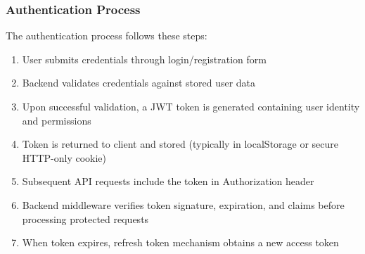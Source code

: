 \documentclass[12pt,a4paper]{article}
\begin{document}
\subsubsection{Authentication Process}
The authentication process follows these steps:

\begin{enumerate}
    \item User submits credentials through login/registration form
    \item Backend validates credentials against stored user data
    \item Upon successful validation, a JWT token is generated containing user identity and permissions
    \item Token is returned to client and stored (typically in localStorage or secure HTTP-only cookie)
    \item Subsequent API requests include the token in Authorization header
    \item Backend middleware verifies token signature, expiration, and claims before processing protected requests
    \item When token expires, refresh token mechanism obtains a new access token
\end{enumerate}
\end{document}
